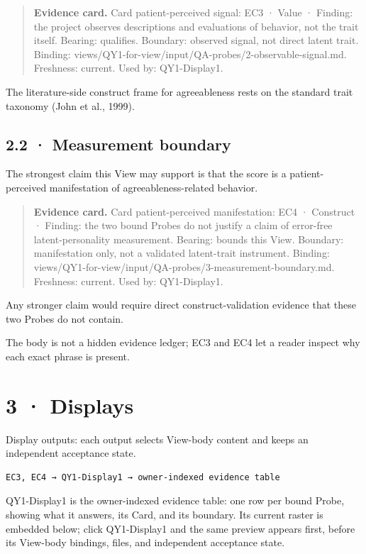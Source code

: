 \documentclass[11pt]{article}
\begin{document}
\begin{quote}\footnotesize\textbf{Evidence card.} Card patient-perceived signal: EC3 · Value · Finding: the project observes descriptions and evaluations of behavior, not the trait itself. Bearing: qualifies. Boundary: observed signal, not direct latent trait. Binding: views/QY1-for-view/input/QA-probes/2-observable-signal.md. Freshness: current. Used by: QY1-Display1.\end{quote}
The literature-side construct frame for agreeableness rests on the standard trait taxonomy (John et al., 1999).

\subsection*{2.2 · Measurement boundary}
The strongest claim this View may support is that the score is a patient-perceived manifestation of agreeableness-related behavior.

\begin{quote}\footnotesize\textbf{Evidence card.} Card patient-perceived manifestation: EC4 · Construct · Finding: the two bound Probes do not justify a claim of error-free latent-personality measurement. Bearing: bounds this View. Boundary: manifestation only, not a validated latent-trait instrument. Binding: views/QY1-for-view/input/QA-probes/3-measurement-boundary.md. Freshness: current. Used by: QY1-Display1.\end{quote}
Any stronger claim would require direct construct-validation evidence that these two Probes do not contain.

The body is not a hidden evidence ledger; EC3 and EC4 let a reader inspect why each exact phrase is present.

\section*{3 · Displays}
Display outputs: each output selects View-body content and keeps an independent acceptance state.

\begin{Verbatim}[fontsize=\small]
EC3, EC4 → QY1-Display1 → owner-indexed evidence table
\end{Verbatim}
QY1-Display1 is the owner-indexed evidence table: one row per bound Probe, showing what it answers, its Card, and its boundary. Its current raster is embedded below; click QY1-Display1 and the same preview appears first, before its View-body bindings, files, and independent acceptance state.
\end{document}
